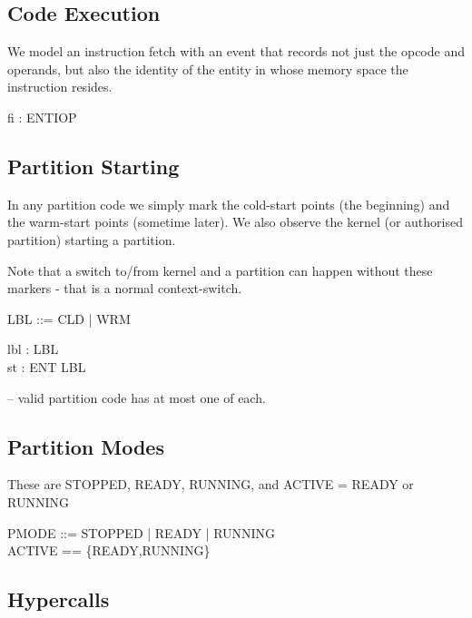 \subsection{Code Execution}

We model an instruction fetch with an event that records not just the opcode
and operands, but also the identity of the entity in whose memory space the
instruction resides.

\begin{circus}

\circchannel fi : ENT\cross I\cross OP
\end{circus}

\subsection{Partition Starting}

In any partition code we simply mark the cold-start points (the beginning)
and the warm-start points (sometime later).
We also observe the kernel (or authorised partition) starting a partition.

Note that a switch to/from kernel and a partition can happen without these
markers - that is a normal context-switch.

\begin{circus}

LBL  %
  ::= CLD   %
  | WRM   %
\end{circus}

\begin{circus}
\circchannel lbl : LBL\\
\circchannel st : ENT \cross LBL  %
\end{circus}
-- valid partition code has at most one of each.

\subsection{Partition Modes}
  These are STOPPED, READY, RUNNING, and ACTIVE = READY or RUNNING

\begin{circus}
PMODE ::= STOPPED | READY | RUNNING\\
ACTIVE == \{READY,RUNNING\} %
\end{circus}

\subsection{Hypercalls }

